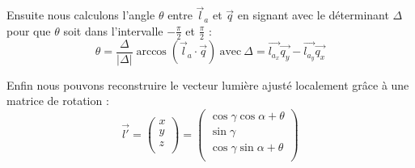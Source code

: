 Ensuite nous calculons l'angle $\theta$ entre $\vec{l}_a$ et $\vec{q}$ en signant avec le déterminant $\Delta$ pour que $\theta$ soit dans l'intervalle  $-\frac{\pi}{2}$ et $\frac{\pi}{2}$ :
\begin{equation}
\label{equationAngleOri}
 \theta = \frac{\Delta}{|\Delta|} \arccos( \vec{l}_a \cdot{\vec{q}}) \ 
 \mathrm{avec} \  
\Delta =  \vec{l_{a_x}}\vec{q_y} - \vec{l_{a_y}}\vec{q_x}
\end{equation}

Enfin nous pouvons reconstruire le vecteur lumière ajusté localement grâce à une matrice de rotation :
\begin{equation}
\label{equationRotationMat}
\vec{l'} = 
\begin{pmatrix}
x \\
y \\
z \\
\end{pmatrix}
=
\begin{pmatrix}
\cos \gamma  \cos \alpha + \theta\\
\sin \gamma \\
\cos \gamma  \sin \alpha + \theta \\
\end{pmatrix}
\end{equation}




